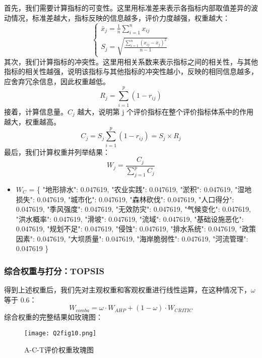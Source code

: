 \documentclass[withoutpreface,bwprint]{cumcmthesis} %
\begin{document}
首先，我们需要计算指标的可变性\cite{bib:one}。这里用标准差来表示各指标内部取值差异的波动情况，标准差越大，指标反映的信息越多，评价力度越强，权重越大：
\begin{equation}
\begin{cases}\bar{x}_{j}=\frac{1}{n} {\textstyle \sum_{i=1}^{n}} x_{ij}   \\S_j=\sqrt{\frac{\sum_{i=1}^{n}(x_{ij}-\bar{x}_j )^2}{n-1} } \end{cases}
\end{equation}
其次，我们计算指标的冲突性。这里用相关系数来表示指标之间的相关性，与其他指标的相关性越强，说明该指标与其他指标的冲突性越小，反映的相同信息越多，应舍弃冗余信息，因此权重越低。
\begin{equation}
R_j=\sum_{i=1}^{p} (1-r_{ij})
\end{equation}
接着，计算信息量。$C_j$ 越大，说明第 j 个评价指标在整个评价指标体系中的作用越大，权重越高。
\begin{equation}
C_j=S_j\sum_{i=1}^{p} (1-r_{ij})=S_j\times R_j
\end{equation}
最后，我们计算权重并列举结果：
\begin{equation}
W_j=\frac{C_j}{\sum_{j=1}^{p}C_j } 
\end{equation}
\begin{itemize}
	\item $W_C$ = \{
		"地形排水": 0.047619,
		"农业实践": 0.047619,
		"淤积": 0.047619,
		"湿地损失": 0.047619,
		"城市化": 0.047619,
		"森林砍伐": 0.047619,
		"人口得分": 0.047619,
		"季风强度": 0.047619,
		"无效防灾": 0.047619,
		"气候变化": 0.047619,
		"洪水概率": 0.047619,
		"滑坡": 0.047619,
		"流域": 0.047619,
		"基础设施恶化": 0.047619,
		"规划不足": 0.047619,
		"侵蚀": 0.047619,
		"排水系统": 0.047619,
		"政策因素": 0.047619,
		"大坝质量": 0.047619,
		"海岸脆弱性": 0.047619,
		"河流管理": 0.047619
	\}
\end{itemize}
\subsubsection{综合权重与打分：TOPSIS}
得到上述权重后，我们先对主观权重和客观权重进行线性运算，在这种情况下，$\omega$ 等于 0.6：
\begin{equation}
W_{comba}=\omega \cdot W_{AHP}+(1-\omega)\cdot W_{CRITIC}
\end{equation}
综合权重的完整结果如玫瑰图：
\begin{figure}[htbp]
	\centering
	\texttt{[image: Q2fig10.png]}
	\caption{A-C-T评价权重玫瑰图}
	\label{Q2fig10.png}
\end{figure}
\end{document}
